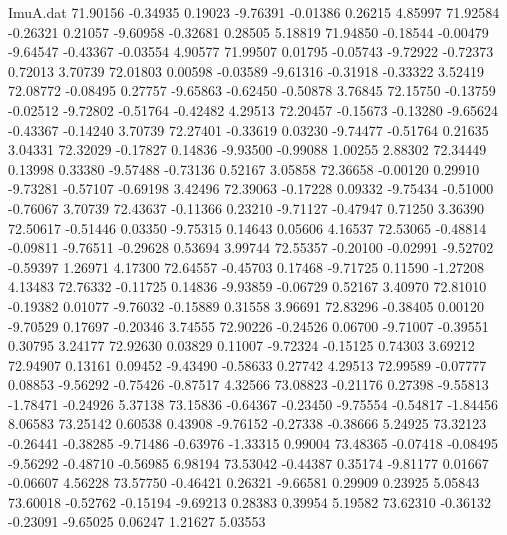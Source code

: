 \begin{filecontents}{ImuA.dat}
  71.90156   -0.34935    0.19023   -9.76391   -0.01386    0.26215    4.85997
  71.92584   -0.26321    0.21057   -9.60958   -0.32681    0.28505    5.18819
  71.94850   -0.18544   -0.00479   -9.64547   -0.43367   -0.03554    4.90577
  71.99507    0.01795   -0.05743   -9.72922   -0.72373    0.72013    3.70739
  72.01803    0.00598   -0.03589   -9.61316   -0.31918   -0.33322    3.52419
  72.08772   -0.08495    0.27757   -9.65863   -0.62450   -0.50878    3.76845
  72.15750   -0.13759   -0.02512   -9.72802   -0.51764   -0.42482    4.29513
  72.20457   -0.15673   -0.13280   -9.65624   -0.43367   -0.14240    3.70739
  72.27401   -0.33619    0.03230   -9.74477   -0.51764    0.21635    3.04331
  72.32029   -0.17827    0.14836   -9.93500   -0.99088    1.00255    2.88302
  72.34449    0.13998    0.33380   -9.57488   -0.73136    0.52167    3.05858
  72.36658   -0.00120    0.29910   -9.73281   -0.57107   -0.69198    3.42496
  72.39063   -0.17228    0.09332   -9.75434   -0.51000   -0.76067    3.70739
  72.43637   -0.11366    0.23210   -9.71127   -0.47947    0.71250    3.36390
  72.50617   -0.51446    0.03350   -9.75315    0.14643    0.05606    4.16537
  72.53065   -0.48814   -0.09811   -9.76511   -0.29628    0.53694    3.99744
  72.55357   -0.20100   -0.02991   -9.52702   -0.59397    1.26971    4.17300
  72.64557   -0.45703    0.17468   -9.71725    0.11590   -1.27208    4.13483
  72.76332   -0.11725    0.14836   -9.93859   -0.06729    0.52167    3.40970
  72.81010   -0.19382    0.01077   -9.76032   -0.15889    0.31558    3.96691
  72.83296   -0.38405    0.00120   -9.70529    0.17697   -0.20346    3.74555
  72.90226   -0.24526    0.06700   -9.71007   -0.39551    0.30795    3.24177
  72.92630    0.03829    0.11007   -9.72324   -0.15125    0.74303    3.69212
  72.94907    0.13161    0.09452   -9.43490   -0.58633    0.27742    4.29513
  72.99589   -0.07777    0.08853   -9.56292   -0.75426   -0.87517    4.32566
  73.08823   -0.21176    0.27398   -9.55813   -1.78471   -0.24926    5.37138
  73.15836   -0.64367   -0.23450   -9.75554   -0.54817   -1.84456    8.06583
  73.25142    0.60538    0.43908   -9.76152   -0.27338   -0.38666    5.24925
  73.32123   -0.26441   -0.38285   -9.71486   -0.63976   -1.33315    0.99004
  73.48365   -0.07418   -0.08495   -9.56292   -0.48710   -0.56985    6.98194
  73.53042   -0.44387    0.35174   -9.81177    0.01667   -0.06607    4.56228
  73.57750   -0.46421    0.26321   -9.66581    0.29909    0.23925    5.05843
  73.60018   -0.52762   -0.15194   -9.69213    0.28383    0.39954    5.19582
  73.62310   -0.36132   -0.23091   -9.65025    0.06247    1.21627    5.03553

\end{filecontents}
